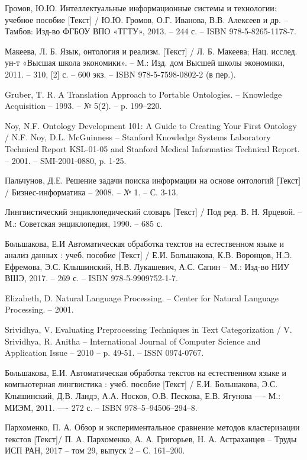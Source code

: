 \begin{thebibliography}{}
	 Громов, Ю.Ю. Интеллектуальные информационные системы и технологии:
	учебное пособие [Текст] /  Ю.Ю. Громов, О.Г. Иванова, В.В. Алексеев и др. -- Тамбов: Изд-во ФГБОУ ВПО «ТГТУ», 2013. -- 244 с. -- ISBN 978-5-8265-1178-7.
	
	 Макеева, Л. Б. Язык, онтология и реализм. [Текст] / Л. Б. Макеева; Нац. исслед. ун-т «Высшая школа экономики». -- М.: Изд. дом Высшей школы экономики, 2011. --
	310, [2] с. -- 600 экз. -- ISBN 978-5-7598-0802-2 (в пер.).
	
	 Gruber, T. R. A Translation Approach to Portable Ontologies. -- Knowledge Acquisition -- 1993. -- № 5(2). -- p. 199–220.
	
	 Noy, N.F. Ontology Development 101: A Guide to Creating Your First Ontology / N.F. Noy, D.L. McGuinness -- Stanford Knowledge Systems Laboratory Technical Report KSL-01-05 and Stanford Medical Informatics Technical Report. -- 2001. -- SMI-2001-0880, p. 1-25.
	
	 Пальчунов, Д.Е. Решение задачи поиска информации на основе онтологий [Текст] / Бизнес-информатика -- 2008. -- № 1. -- С. 3-13.
	
	 Лингвистический энциклопедический словарь [Текст] / Под ред. В. Н. Ярцевой. -- М.: Советская энциклопедия, 1990. -- 685 с.
	
	 Большакова, Е.И Автоматическая обработка текстов на естественном языке и анализ данных : учеб. пособие [Текст] / Е.И. Большакова, К.В. Воронцов, Н.Э. Ефремова, Э.С. Клышинский, Н.В. Лукашевич, А.С. Сапин -- М.: Изд-во НИУ ВШЭ, 2017. -- 269 с. -- ISBN 978-5-9909752-1-7.
	
	 Elizabeth, D. Natural Language Processing. -- Center for Natural Language Processing. -- 2001. 
	
	 Srividhya, V. Evaluating Preprocessing Techniques in Text Categorization / V. Srividhya, R. Anitha -- International Journal of Computer Science and Application Issue -- 2010 -- p. 49-51. -- ISSN 0974-0767.
	
	 Большакова, Е.И. Автоматическая обработка текстов на естественном языке и компьютерная лингвистика : учеб. пособие [Текст] / Е.И. Большакова, Э.С. Клышинский, Д.В. Ландэ, А.А. Носков, О.В. Пескова, Е.В. Ягунова —- М.: МИЭМ, 2011. —- 272 с. -- ISBN 978–5–94506–294–8.
	
	 Пархоменко, П. А. Обзор и экспериментальное сравнение методов кластеризации текстов [Текст]/ П. А. Пархоменко, А. А. Григорьев, Н. А. Астраханцев -- Труды ИСП РАН, 2017 -- том 29, выпуск 2 -- С. 161–200.
	

\end{thebibliography}

